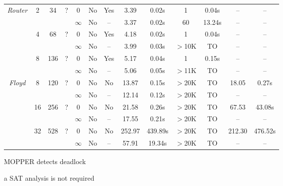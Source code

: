\begin{savenotes}
\begin{table*}[t]
\begin{center}
\begin{threeparttable}
\begin{tabular}{|c|c|c|c|c|c|c||c|c||c|c||c|c|}
            \multirow{6}{*}{\textit{Router}} & \multirow{2}{*}{2} & \multirow{2}{*}{34} &  \multirow{2}{*}{?} 
          												     & 0 & No & Yes & 3.39 & 0.02s & 1 & 0.04s & -- & -- \tnote{a}\\ \cline{5-13}
          						       &                            & &  &  $\infty$ & No & -- & 3.37 & 0.02s & 60 & 13.24s &  -- & --\\ \cline{2-13}
						       		& \multirow{2}{*}{4} & \multirow{2}{*}{68} &  \multirow{2}{*}{?} 
          												     & 0 & No & Yes & 4.18 & 0.02s & 1 & 0.04s & -- & --\tnote{a}\\ \cline{5-13}
          						       &                            & &  &  $\infty$ & No & -- & 3.99 & 0.03s & $>$10K & TO &  -- & --\\ \cline{2-13}
						              & \multirow{2}{*}{8} & \multirow{2}{*}{136} &  \multirow{2}{*}{?} 
          												     & 0 & No & Yes & 5.17 & 0.04s & 1 & 0.15s & -- & --\tnote{a}\\ \cline{5-13}
          						       &                            & &  &  $\infty$ & No & -- & 5.06 & 0.05s & $>$11K & TO & --  & --\\ \hline
						       \hline
						       
	    \multirow{6}{*}{\textit{Floyd}} & \multirow{2}{*}{8} & \multirow{2}{*}{120} &  \multirow{2}{*}{?} 
          												     & 0 & No & No & 13.87 & 0.15s & $>$20K & TO & 18.05 & 0.27s\\ \cline{5-13}
          						       &                            & &  &  $\infty$ & No & -- & 12.14 & 0.12s & $>$20K & TO &  -- & --\\ \cline{2-13}
						       		& \multirow{2}{*}{16} & \multirow{2}{*}{256} &  \multirow{2}{*}{?} 
          												     & 0 & No & No & 21.58 & 0.26s & $>$20K & TO & 67.53 & 43.08s\\ \cline{5-13}
          						       &                            & &  &  $\infty$ & No & -- & 17.55 & 0.21s & $>$20K & TO &  -- & --\\ \cline{2-13}
						              & \multirow{2}{*}{32} & \multirow{2}{*}{528} &  \multirow{2}{*}{?} 
          												     & 0 & No & No & 252.97 & 439.89s & $>$20K & TO & 212.30 & 476.52s\\ \cline{5-13}
          						       &                            & &  &  $\infty$ & No & -- & 57.91 & 19.34s & $>$20K & TO & --  & --\\ \hline
         
\end{tabular}
\begin{tablenotes}
\item[\textdagger] MOPPER detects deadlock \item[a] SAT analysis is not required
\end{tablenotes}
     \end{threeparttable}
\end{center}
\end{table*}
\end{savenotes}

